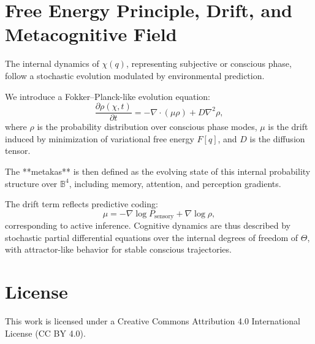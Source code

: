 \documentclass[12pt]{article}
\begin{document}
\section{Free Energy Principle, Drift, and Metacognitive Field}

The internal dynamics of \( \chi(q) \), representing subjective or conscious phase, follow a stochastic evolution modulated by environmental prediction.

We introduce a Fokker–Planck-like evolution equation:
\[
\frac{\partial \rho(\chi, t)}{\partial t} = -\nabla \cdot \left( \mu \rho \right) + D \nabla^2 \rho,
\]
where \( \rho \) is the probability distribution over conscious phase modes, \( \mu \) is the drift induced by minimization of variational free energy \( F[q] \), and \( D \) is the diffusion tensor.

The **metakas** is then defined as the evolving state of this internal probability structure over \( \mathbb{B}^4 \), including memory, attention, and perception gradients.

The drift term reflects predictive coding:
\[
\mu = -\nabla \log P_\text{sensory} + \nabla \log \rho,
\]
corresponding to active inference. Cognitive dynamics are thus described by stochastic partial differential equations over the internal degrees of freedom of \( \Theta \), with attractor-like behavior for stable conscious trajectories.

\section*{License}
This work is licensed under a Creative Commons Attribution 4.0 International License (CC BY 4.0).
\end{document}

